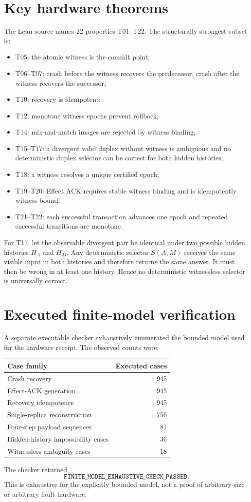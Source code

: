 \documentclass[11pt,a4paper]{article}
\begin{document}
\section{Key hardware theorems}
The Lean source names 22 properties T01--T22. The structurally strongest subset is:
\begin{itemize}[leftmargin=*]
\item T05: the atomic witness is the commit point;
\item T06--T07: crash before the witness recovers the predecessor, crash after the witness recovers the successor;
\item T10: recovery is idempotent;
\item T12: monotone witness epochs prevent rollback;
\item T14: mix-and-match images are rejected by witness binding;
\item T15--T17: a divergent valid duplex without witness is ambiguous and no deterministic duplex selector can be correct for both hidden histories;
\item T18: a witness resolves a unique certified epoch;
\item T19--T20: Effect ACK requires stable witness binding and is idempotently witness-bound;
\item T21--T22: each successful transaction advances one epoch and repeated successful transitions are monotone.
\end{itemize}

For T17, let the observable divergent pair be identical under two possible hidden histories $H_A$ and $H_M$. Any deterministic selector $S(A,M)$ receives the same visible input in both histories and therefore returns the same answer. It must then be wrong in at least one history. Hence no deterministic witnessless selector is universally correct.

\section{Executed finite-model verification}
A separate executable checker exhaustively enumerated the bounded model used for the hardware receipt. The observed counts were:
\begin{center}
\begin{tabular}{lr}
\toprule
Case family & Executed cases\\
\midrule
Crash recovery & 945\\
Effect-ACK generation & 945\\
Recovery idempotence & 945\\
Single-replica reconstruction & 756\\
Four-step payload sequences & 81\\
Hidden-history impossibility cases & 36\\
Witnessless ambiguity cases & 18\\
\bottomrule
\end{tabular}
\end{center}
The checker returned
\[
\boxed{\texttt{FINITE\_MODEL\_EXHAUSTIVE\_CHECK\_PASSED}}.
\]
This is exhaustive for the explicitly bounded model, not a proof of arbitrary-size or arbitrary-fault hardware.
\end{document}
